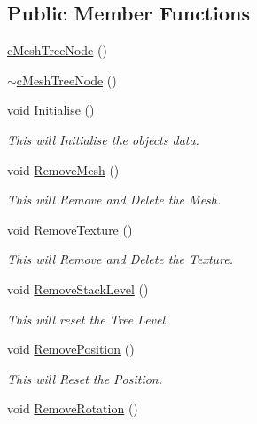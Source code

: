 \subsection*{Public Member Functions}
\begin{DoxyCompactItemize}
\item 
\hyperlink{classc_mesh_tree_node_aa0506651f17427bfdbababeb406eb8f3}{cMeshTreeNode} ()
\item 
\hyperlink{classc_mesh_tree_node_a6879af803641d312d8ba07d5361198b3}{$\sim$cMeshTreeNode} ()
\item 
void \hyperlink{classc_mesh_tree_node_a043efc30a09c9a474d75b7c5e79abccc}{Initialise} ()
\begin{DoxyCompactList}\small\item\em This will Initialise the objects data. \item\end{DoxyCompactList}\item 
void \hyperlink{classc_mesh_tree_node_ac75b9a8974308873997ad6fcc5baa0da}{RemoveMesh} ()
\begin{DoxyCompactList}\small\item\em This will Remove and Delete the Mesh. \item\end{DoxyCompactList}\item 
void \hyperlink{classc_mesh_tree_node_ab3c5c436df69d8f6ef8a5348e76f5784}{RemoveTexture} ()
\begin{DoxyCompactList}\small\item\em This will Remove and Delete the Texture. \item\end{DoxyCompactList}\item 
void \hyperlink{classc_mesh_tree_node_a289e7a882f0304a0e2738a7cca5db60d}{RemoveStackLevel} ()
\begin{DoxyCompactList}\small\item\em This will reset the Tree Level. \item\end{DoxyCompactList}\item 
void \hyperlink{classc_mesh_tree_node_ad9659fb0be5e1300bcda2265d651dd97}{RemovePosition} ()
\begin{DoxyCompactList}\small\item\em This will Reset the Position. \item\end{DoxyCompactList}\item 
void \hyperlink{classc_mesh_tree_node_a9ea8fa642a22c047b2e6d559976b615b}{RemoveRotation} ()

\end{DoxyCompactItemize}
